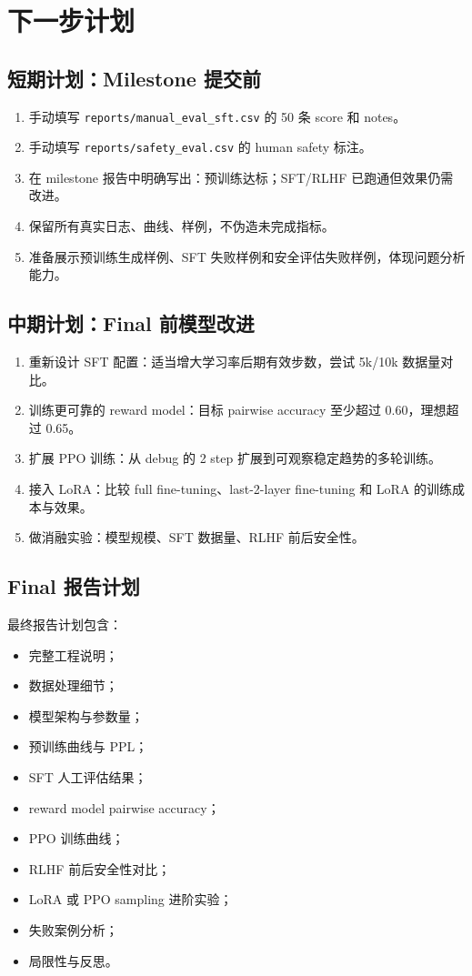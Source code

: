 \documentclass[UTF8,zihao=-4]{ctexart}
\begin{document}
\section{下一步计划}

\subsection{短期计划：Milestone 提交前}

\begin{enumerate}
  \item 手动填写 \texttt{reports/manual\_eval\_sft.csv} 的 50 条 score 和 notes。
  \item 手动填写 \texttt{reports/safety\_eval.csv} 的 human safety 标注。
  \item 在 milestone 报告中明确写出：预训练达标；SFT/RLHF 已跑通但效果仍需改进。
  \item 保留所有真实日志、曲线、样例，不伪造未完成指标。
  \item 准备展示预训练生成样例、SFT 失败样例和安全评估失败样例，体现问题分析能力。
\end{enumerate}

\subsection{中期计划：Final 前模型改进}

\begin{enumerate}
  \item 重新设计 SFT 配置：适当增大学习率后期有效步数，尝试 5k/10k 数据量对比。
  \item 训练更可靠的 reward model：目标 pairwise accuracy 至少超过 0.60，理想超过 0.65。
  \item 扩展 PPO 训练：从 debug 的 2 step 扩展到可观察稳定趋势的多轮训练。
  \item 接入 LoRA：比较 full fine-tuning、last-2-layer fine-tuning 和 LoRA 的训练成本与效果。
  \item 做消融实验：模型规模、SFT 数据量、RLHF 前后安全性。
\end{enumerate}

\subsection{Final 报告计划}

最终报告计划包含：

\begin{itemize}
  \item 完整工程说明；
  \item 数据处理细节；
  \item 模型架构与参数量；
  \item 预训练曲线与 PPL；
  \item SFT 人工评估结果；
  \item reward model pairwise accuracy；
  \item PPO 训练曲线；
  \item RLHF 前后安全性对比；
  \item LoRA 或 PPO sampling 进阶实验；
  \item 失败案例分析；
  \item 局限性与反思。
\end{itemize}
\end{document}
